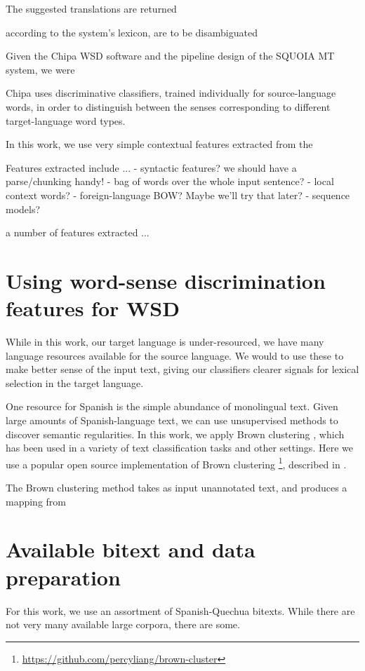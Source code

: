 \documentclass[10pt, a4paper]{article}
\begin{document}
The suggested translations are returned 


according to the system's lexicon, 
are to be disambiguated 

Given the Chipa WSD software and the pipeline design of the SQUOIA MT system,
we were





Chipa uses discriminative classifiers, trained individually for source-language
words, in order to distinguish between the senses corresponding to different
target-language word types.

In this work, we use very simple contextual features extracted from the 

Features extracted include ...
- syntactic features? we should have a parse/chunking handy!
- bag of words over the whole input sentence?
- local context words?
- foreign-language BOW? Maybe we'll try that later?
- sequence models?

a number of features extracted ...


\section{Using word-sense discrimination features for WSD}
While in this work, our target language is under-resourced, we have many
language resources available for the source language. We would to use these to
make better sense of the input text, giving our classifiers clearer signals for
lexical selection in the target language.

One resource for Spanish is the simple abundance of monolingual text. Given
large amounts of Spanish-language text, we can use unsupervised methods to
discover semantic regularities. In this work, we apply Brown clustering
\cite{Brown92class-basedn-gram}, which has been used in a variety of text
classification tasks and other settings. Here we use a popular open source
implementation of Brown clustering
\footnote{\url{https://github.com/percyliang/brown-cluster}}, described in
\cite{Liang05semi-supervisedlearning}.

The Brown clustering method takes as input unannotated text, and produces a
mapping from 

\section{Available bitext and data preparation}
For this work, we use an assortment of Spanish-Quechua bitexts.
While there are not very many available large corpora, there are some.
\end{document}
